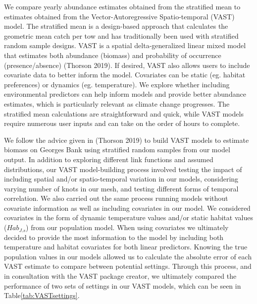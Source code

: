\documentclass[
  12pt,
]{article}
\begin{document}
We compare yearly abundance estimates obtained from the stratified mean to estimates obtained from the Vector-Autoregressive Spatio-temporal (VAST) model. The stratified mean is a design-based approach that calculates the geometric mean catch per tow and has traditionally been used with stratified random sample designs. VAST is a spatial delta-generalized linear mixed model that estimates both abundance (biomass) and probability of occurrence (presence/absence) (Thorson 2019). If desired, VAST also allows users to include covariate data to better inform the model. Covariates can be static (eg. habitat preferences) or dynamics (eg. temperature). We explore whether including environmental predictors can help inform models and provide better abundance estimates, which is particularly relevant as climate change progresses. The stratified mean calculations are straightforward and quick, while VAST models require numerous user inputs and can take on the order of hours to complete.

We follow the advice given in (Thorson 2019) to build VAST models to estimate biomass on Georges Bank using stratified random samples from our model output. In addition to exploring different link functions and assumed distributions, our VAST model-building process involved testing the impact of including spatial and/or spatio-temporal variation in our models, considering varying number of knots in our mesh, and testing different forms of temporal correlation. We also carried out the same process running models without covariate information as well as including covariates in our model. We considered covariates in the form of dynamic temperature values and/or static habitat values (\(Hab_{J.s}\)) from our population model. When using covariates we ultimately decided to provide the most information to the model by including both temperature and habitat covariates for both linear predictors. Knowing the true population values in our models allowed us to calculate the absolute error of each VAST estimate to compare between potential settings. Through this process, and in consultation with the VAST package creator, we ultimately compared the performance of two sets of settings in our VAST models, which can be seen in Table\ref{tab:VASTsettings}.
\end{document}

